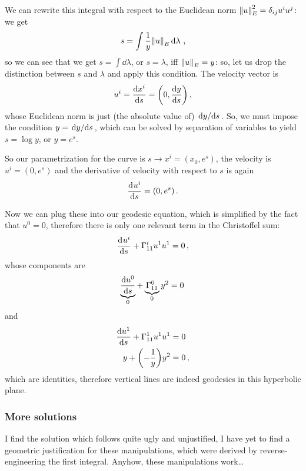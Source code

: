 \documentclass[main.tex]{subfiles}
\begin{document}
We can rewrite this integral with respect to the Euclidean norm \(\norm{u}_E^2 = \delta_{ij} u^{i} u^{j}\): we get 
%
\begin{align}
  s = \int \frac{1}{y} \norm{u}_E \dd{\lambda }
\,,
\end{align}
%
so we can see that we get \(s = \int \dd{\lambda }\), or \(s = \lambda \), iff \(\norm{u}_E = y\): so, let us drop the distinction between \(s\) and \(\lambda \) and apply this condition.
The velocity vector is 
%
\begin{align}
  u^{i} = \dv{x^{i}}{s} = \qty(0, \dv{y}{s})
\,,
\end{align}
%
whose Euclidean norm is just (the absolute value of) \(\dv*{y}{s}\). 
So, we must impose the condition \(y = \dv*{y}{s}\), which can be solved by separation of variables to yield \(s = \log y\), or \(y = e^{s}\). 

So our parametrization for the curve is \(s \rightarrow x^{i} = (x_0, e^{s})\), the velocity is \(u^{i} = (0, e^{s})\) and the derivative of velocity with respect to \(s\) is again 
%
\begin{align}
  \dv[]{u^{i}}{s} = (0, e^{s})
\,.
\end{align}

Now we can plug these into our geodesic equation, which is simplified by the fact that \(u^{0} = 0\), therefore there is only one relevant term in the Christoffel sum: 
%
\begin{align}
  \dv[]{ u^{i}}{s} + \Gamma^{i}_{11} u^{1} u^{1} = 0
\,,
\end{align}
%
whose components are 
%
\begin{align}
  \underbrace{\dv{ u^{0}}{s}}_{0} + \underbrace{\Gamma^{0}_{11}}_{0} y^2 = 0
\,
\end{align}
%
and 
%
\begin{subequations}
  \begin{align}
    \dv{ u^{1}}{s} + \Gamma^{1}_{11} u^{1} u^{1} &= 0  \\
    y + \qty(- \frac{1}{y}) y^2 &=0
    \,,
  \end{align}
\end{subequations}
%
which are identities, therefore vertical lines are indeed geodesics in this hyperbolic plane.

\subsubsection{More solutions}

I find the solution which follows quite ugly and unjustified, I have yet to find a geometric justification for these manipulations, which were derived by reverse-engineering the first integral.
Anyhow, these manipulations work\dots
\end{document}
